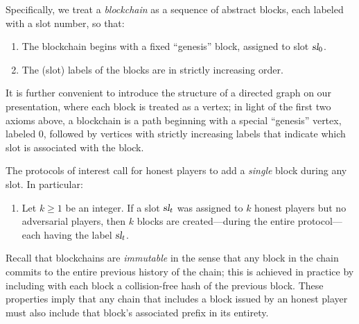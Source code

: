 Specifically, we treat a \emph{blockchain} as
a sequence of abstract blocks, each labeled with a slot number, so
that:
\begin{enumerate}[label={\textbf{A\arabic*}}., ref={\textbf{A\arabic*}}, resume=axiom]
  \item\label{axiom:root} 
  The blockchain begins with a fixed ``genesis'' block, assigned to slot $\textsl{sl}_0$.
  
  \item\label{axiom:labels} 
  The (slot) labels of the blocks are in strictly increasing order.
\end{enumerate}
It is further convenient to introduce the structure of a directed
graph on our presentation, where each block is treated as a vertex; in
light of the first two axioms above, a blockchain is a path beginning
with a special ``genesis'' vertex, labeled $0$, followed by vertices
with strictly increasing labels that indicate which slot is associated
with the block. %
\begin{center}
\end{center}
The protocols of interest call for honest players to add a
\emph{single} block %
during any slot. In particular:
\begin{enumerate}[label={\textbf{A\arabic*}}., ref={\textbf{A\arabic*}}, resume=axiom]
  \item\label{axiom:honest}
   Let $k \geq 1$ be an integer. 
  If a slot $\textsl{sl}_t$ was assigned to $k$ honest players but no adversarial players, 
  then $k$ blocks are created---during the entire protocol---each having the label $\textsl{sl}_t$.
\end{enumerate}
Recall that blockchains are \emph{immutable} in the sense that any
block in the chain commits to the entire previous history of the
chain; this is achieved in practice by including with each block a
collision-free hash of the previous block. These properties imply that
any chain that includes a block issued by an honest player 
must also include that block's associated prefix in its entirety.

